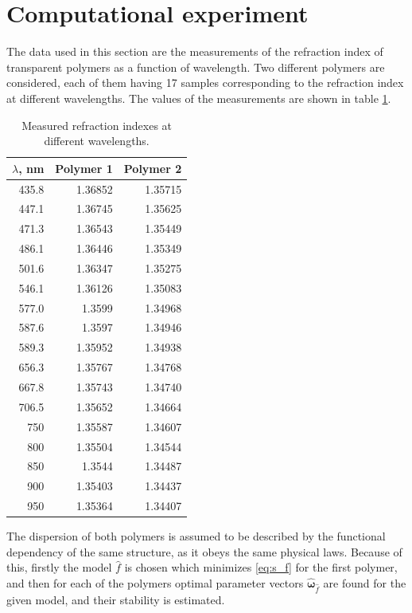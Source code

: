 \documentclass[11pt,a4paper]{article}
\theoremstyle{definition}
\begin{document}
\section{Computational experiment}

The data used in this section are the measurements of the refraction index
of transparent polymers as a function of wavelength. Two different polymers
are considered, each of them having 17 samples corresponding to the
refraction index at different wavelengths. The values of the measurements
are shown in table \ref{tabl:source_data}.

\begin{table}[h]
  \footnotesize
  \caption{Measured refraction indexes at different wavelengths.}
  \centering
  \begin{tabular}{r | r | r}
	$\lambda$, nm	& Polymer 1 & Polymer 2 \\ \hline
	435.8 & 1.36852 & 1.35715 \\
	447.1 & 1.36745 & 1.35625 \\
	471.3 & 1.36543 & 1.35449 \\
	486.1 & 1.36446 & 1.35349 \\
	501.6 & 1.36347 & 1.35275 \\
	546.1 & 1.36126 & 1.35083 \\
	577.0 & 1.3599 & 1.34968 \\
	587.6 & 1.3597 & 1.34946 \\
	589.3 & 1.35952 & 1.34938 \\
	656.3 & 1.35767 & 1.34768 \\
	667.8 & 1.35743 & 1.34740 \\
	706.5 & 1.35652 & 1.34664 \\
	750 & 1.35587 & 1.34607 \\
	800 & 1.35504 & 1.34544 \\
	850 & 1.3544 & 1.34487 \\
	900 & 1.35403 & 1.34437 \\
	950 & 1.35364 & 1.34407 \\
  \end{tabular}
  \label{tabl:source_data}
\end{table}

The dispersion of both polymers is assumed to be described by the functional dependency
of the same structure, as it obeys the same physical laws. Because of this, firstly the
model $\hat{f}$ is chosen which minimizes \eqref{eq:s_f} for the first polymer, and then
for each of the polymers optimal parameter vectors $\hat{\boldsymbol{\omega}}_{\hat{f}}$
are found for the given model, and their stability is estimated.
\end{document}
